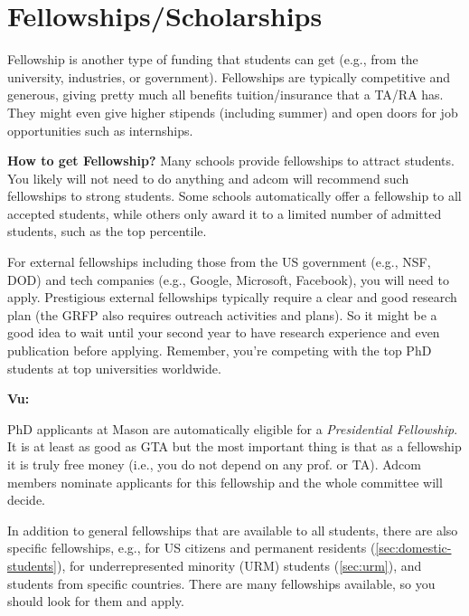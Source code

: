 \documentclass[oneside,11pt,dvipsnames]{book}
\newenvironment{commentbox}[1][]{
  \small
  \begin{mybox}
    {\small \textbf{#1}}
  }{
  \end{mybox}
}
\begin{document}
\section{Fellowships/Scholarships}\label{sec:fellowships}

Fellowship is another type of funding that students can get (e.g., from the university, industries, or government).
Fellowships are typically competitive and generous, giving pretty much all benefits tuition/insurance that a TA/RA has.  They might even give higher stipends (including summer) and open doors for job opportunities such as internships.

\textbf{How to get Fellowship?}   Many schools provide fellowships to attract students. You likely will not need to do anything and adcom will recommend such fellowships to strong students. Some schools automatically offer a fellowship to all accepted students, while others only award it to a limited number of admitted students, such as the top percentile.

For external fellowships including those from the US government (e.g., NSF, DOD) and tech companies (e.g., Google, Microsoft, Facebook), you will need to apply.  %
Prestigious external fellowships typically require a clear and good research plan (the GRFP also requires outreach activities and plans). So it might be a good idea to wait until your second year to have research experience and even publication before applying. Remember, you're competing with the top PhD students at top universities worldwide.

\begin{commentbox}[Vu:]
  PhD applicants at Mason are automatically eligible for a \emph{Presidential Fellowship}.  It is at least as good as GTA but the most important thing is that as a fellowship it is truly free money (i.e., you do not depend on any prof. or TA).  Adcom members nominate applicants for this fellowship and the whole committee will decide.
\end{commentbox}

In addition to general fellowships that are available to all students, there are also specific fellowships, e.g., for US citizens and permanent residents (\autoref{sec:domestic-students}), for underrepresented minority (URM) students (\autoref{sec:urm}), and students from specific countries. There are many fellowships available, so you should look for them and apply.
\end{document}
